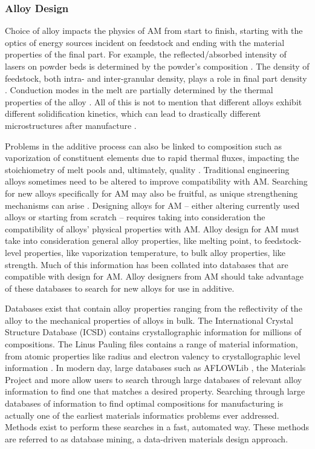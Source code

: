 \subsubsection{Alloy Design}
Choice of alloy impacts the physics of AM from start to finish, starting with the optics of energy sources incident on feedstock and ending with the material properties of the final part. For example, the reflected/absorbed intensity of lasers on powder beds is determined by the powder's composition \cite{Boley2016, Trapp2017}. The density of feedstock, both intra- and inter-granular density, plays a role in final part density \cite{Bi2013}. Conduction modes in the melt are partially determined by the thermal properties of the alloy \cite{Martin2017}. All of this is not to mention that different alloys exhibit different solidification kinetics, which can lead to drastically different microstructures after manufacture \cite{Collins2016}. 

Problems in the additive process can also be linked to composition such as vaporization of constituent elements due to rapid thermal fluxes, impacting the stoichiometry of melt pools and, ultimately, quality \cite{Brice2018}. Traditional engineering alloys sometimes need to be altered to improve compatibility with AM. Searching for new alloys specifically for AM may also be fruitful, as unique strengthening mechanisms can arise \cite{Brice2018, Wang2017}. Designing alloys for AM -- either altering currently used alloys or starting from scratch -- requires taking into consideration the compatibility of alloys' physical properties with AM. Alloy design for AM must take into consideration general alloy properties, like melting point, to feedstock-level properties, like vaporization temperature, to bulk alloy properties, like strength. Much of this information has been collated into databases that are compatible with design for AM. Alloy designers from AM should take advantage of these databases to search for new alloys for use in additive. 

Databases exist that contain alloy properties ranging from the reflectivity of the alloy to the mechanical properties of alloys in bulk. The International Crystal Structure Database (ICSD) contains crystallographic information for millions of compositions. The Linus Pauling files contains a range of material information, from atomic properties like radius and electron valency to crystallographic level information \cite{Villars1998}. In modern day, large databases such as AFLOWLib \cite{Curtarolo2012a}, the Materials Project \cite{Jain2013} and more allow users to search through large databases of relevant alloy information to find one that matches a desired property. Searching through large databases of information to find optimal compositions for manufacturing is actually one of the earliest materials informatics problems ever addressed. Methods exist to perform these searches in a fast, automated way. These methods are referred to as database mining, a data-driven materials design approach.

